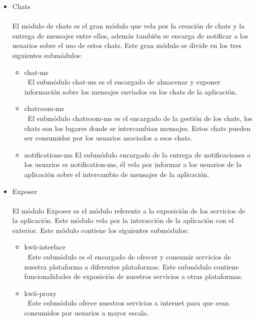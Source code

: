 \begin{itemize}
    \item Chats \\\\
    El módulo de chats es el gran módulo que vela por la creación de chats y la entrega de mensajes entre ellos, además también se encarga de notificar a los usuarios sobre el uso de estos chats. Este gran módulo se divide en los tres siguientes submódulos:
    \begin{itemize}
        \item chat-ms\\\
        El submódulo chat-ms es el encargado de almacenar y exponer información sobre los mensajes enviados en los chats de la aplicación.
        \item chatroom-ms\\\
        El submódulo chatroom-ms es el encargado de la gestión de los chats, los chats son los lugares donde se intercambian mensajes. Estos chats pueden ser consumidos por los usuarios asociados a esos chats.
        \item notifications-ms
        El submódulo encargado de la entrega de notificaciones a los usuarios es notification-ms, él vela por informar a los usuarios de la aplicación sobre el intercambio de mensajes de la aplicación.
    \end{itemize}

    \item Exposer\\\\
    El módulo Exposer es el módulo referente a la exposición de los servicios de la aplicación. Este módulo vela por la interacción de la aplicación con el exterior. Este módulo contiene los siguientes submódulos:
    \begin{itemize}
        \item kwii-interface\\\
        Este submódulo es el encargado de ofrecer y consumir servicios de nuestra plataforma a diferentes plataformas. Este submódulo contiene funcionalidades de exposición de nuestros servicios a otras plataformas.
        \item kwii-proxy\\\
        Este submódulo ofrece nuestros servicios a internet para que sean consumidos por usuarios a mayor escala.
    \end{itemize}


\end{itemize}
